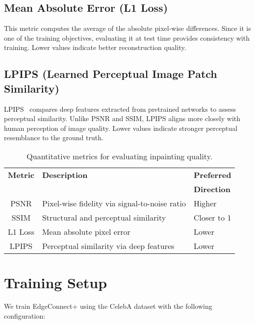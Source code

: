 \documentclass[10pt,twocolumn,letterpaper]{article}
\begin{document}
\subsection{Mean Absolute Error (L1 Loss)}

This metric computes the average of the absolute pixel-wise differences. Since it is one of the training objectives, evaluating it at test time provides consistency with training. Lower values indicate better reconstruction quality.

\subsection{LPIPS (Learned Perceptual Image Patch Similarity)}

LPIPS~\cite{zhang2018unreasonable} compares deep features extracted from pretrained networks to assess perceptual similarity. Unlike PSNR and SSIM, LPIPS aligns more closely with human perception of image quality. Lower values indicate stronger perceptual resemblance to the ground truth.

\begin{table}[h]
\centering
\renewcommand{\arraystretch}{1.3}
\begin{tabular}{|c|p{4cm}|>{\centering\arraybackslash}p{2.0cm}|}
\hline
\textbf{Metric} & \textbf{Description} & \textbf{Preferred}\\
               &                      & \textbf{Direction} \\
\hline
PSNR  & Pixel-wise fidelity via signal-to-noise ratio     & Higher \\
SSIM  & Structural and perceptual similarity              & Closer to 1 \\
L1 Loss & Mean absolute pixel error                      & Lower \\
LPIPS & Perceptual similarity via deep features           & Lower \\
\hline
\end{tabular}
\caption{Quantitative metrics for evaluating inpainting quality.}
\end{table}

\section{Training Setup}

We train EdgeConnect+ using the CelebA dataset with the following configuration:
\end{document}
